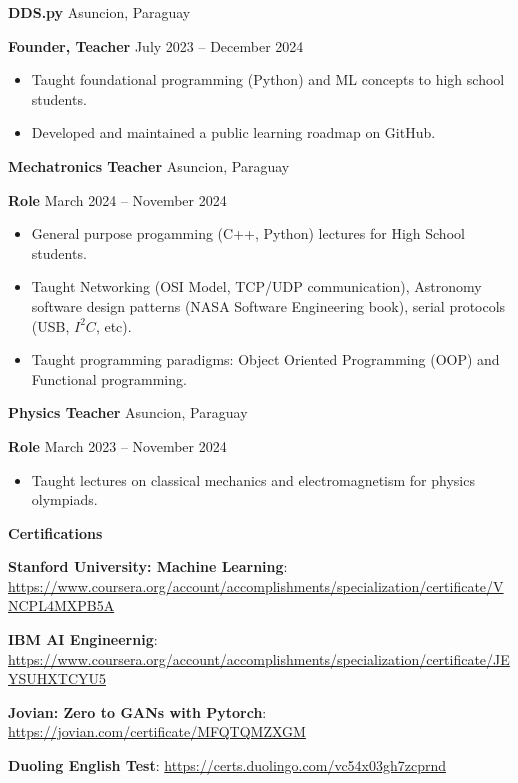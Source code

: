 \documentclass[11pt]{article}
\begin{document}
\textbf{DDS.py}	\hfill Asuncion, Paraguay

\textbf{Founder, Teacher} \hfill July 2023 – December 2024
\begin{itemize}[noitemsep, topsep=0pt, partopsep=0pt, parsep=0pt]
  \item Taught foundational programming (Python) and ML concepts to high school students.
  \item Developed and maintained a public learning roadmap on GitHub.
\end{itemize}

\textbf{Mechatronics Teacher}	\hfill Asuncion, Paraguay

\textbf{Role} \hfill March 2024 – November 2024
\begin{itemize}[noitemsep, topsep=0pt, partopsep=0pt, parsep=0pt]
  \item General purpose progamming (C++, Python) lectures for High School students.
  \item Taught Networking (OSI Model, TCP/UDP communication), Astronomy software design patterns (NASA Software Engineering book), serial protocols (USB, $I^{2}C$, etc).
  \item Taught programming paradigms: Object Oriented Programming (OOP) and Functional programming.
\end{itemize}

\textbf{Physics Teacher}	\hfill Asuncion, Paraguay

\textbf{Role} \hfill March 2023 – November 2024
\begin{itemize}[noitemsep, topsep=0pt, partopsep=0pt, parsep=0pt]
  \item Taught lectures on classical mechanics and electromagnetism for physics olympiads.
\end{itemize}


\begin{center}
    \textbf{Certifications}
\end{center}

\textbf{Stanford University: Machine Learning}: \url{https://www.coursera.org/account/accomplishments/specialization/certificate/VNCPL4MXPB5A}

\textbf{IBM AI Engineernig}: \url{https://www.coursera.org/account/accomplishments/specialization/certificate/JEYSUHXTCYU5}

\textbf{Jovian: Zero to GANs with Pytorch}: \url{https://jovian.com/certificate/MFQTQMZXGM}

\textbf{Duoling English Test}: \url{https://certs.duolingo.com/vc54x03gh7zcprnd}
\end{document}

